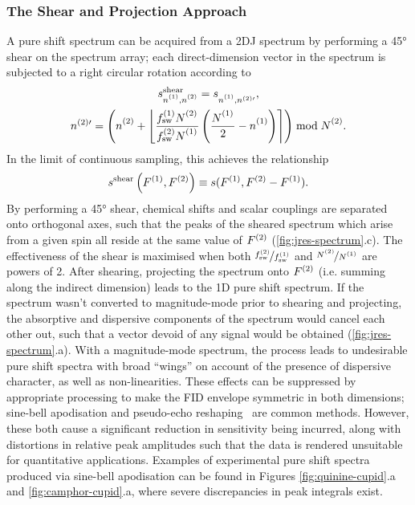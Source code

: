 \subsubsection{The Shear and Projection Approach}
A pure shift spectrum can be acquired from a \ac{2DJ} spectrum by performing a
\ang{45} shear on the spectrum array; each direct-dimension vector in the
spectrum is subjected to a right circular rotation according to
\begin{subequations}
    \begin{gather}
        s_{\none,\ntwo}^{\text{shear}} =
            s_{\none,n^{(2)\prime}}^{\vphantom{{\text{tilt}}}},\\
        n^{(2)\prime} = \left(\ntwo + \left\lfloor
                \frac
                    {\fswone \Ntwo\vpsub{\mathrm{sw}}}
                    {\fswtwo \None\vpsub{\mathrm{sw}}}
                \left(
                    \frac{\None\vpsub{\mathrm{sw}}}{2} - \none
                \right)
            \right\rceil
        \right) \bmod \Ntwo.
    \end{gather}
\end{subequations}
In the limit of continuous sampling, this achieves the relationship
\[
    s^{\text{shear}}\left(F^{(1)},F^{(2)}\right) \equiv s(F^{(1)}, F^{(2)} - F^{(1)}).
\]
By performing a \ang{45} shear, chemical shifts and scalar couplings are
separated onto orthogonal axes,
such that the peaks of the sheared spectrum which arise from a given spin all
reside at the same value of $F^{(2)}$ (\cref{fig:jres-spectrum}.c). The
effectiveness of the shear is maximised when both $\nicefrac{f_{\mathrm{sw}}^{(2)}}{f_{\mathrm{sw}}^{(1)}}$
and $\nicefrac{\Ntwo}{\None}$ are powers of 2. After shearing, projecting the
spectrum onto $F^{(2)}$ (i.e. summing along the indirect dimension) leads
to the \ac{1D} pure shift spectrum.
If the spectrum wasn't converted to magnitude-mode prior to shearing and
projecting, the absorptive and dispersive components of the spectrum would
cancel each other out, such that a vector devoid of any signal would be
obtained (\cref{fig:jres-spectrum}.a).
With a magnitude-mode spectrum, the process leads to undesirable pure shift
spectra with broad ``wings'' on account of the presence of dispersive
character, as well as non-linearities. These effects can be suppressed by
appropriate
processing to make the FID envelope symmetric in both dimensions;
sine-bell apodisation and pseudo-echo reshaping~\cite{Bax1981} are common methods.
However, these both cause a significant reduction in sensitivity being
incurred, along with distortions in relative peak amplitudes such that the data is
rendered unsuitable for quantitative applications. Examples of experimental
pure shift spectra produced via sine-bell apodisation can be found in
Figures \ref{fig:quinine-cupid}.a and \ref{fig:camphor-cupid}.a, where
severe discrepancies in peak integrals exist.

